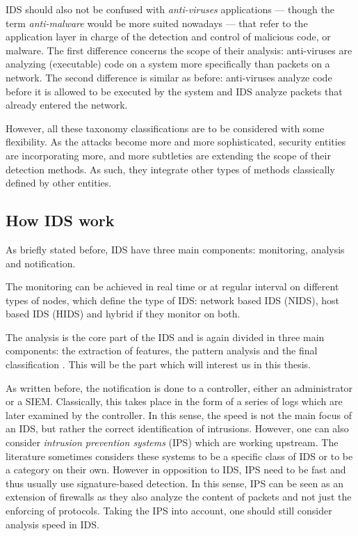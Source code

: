 IDS should also not be confused with \emph{anti-viruses} applications --- though the term \emph{anti-malware} would be more suited nowadays --- that refer to the application layer in charge of the detection and control of malicious code, or malware. The first difference concerns the scope of their analysis: anti-viruses are analyzing (executable) code on a system more specifically than packets on a network. The second difference is similar as before: anti-viruses analyze code before it is allowed to be executed by the system and IDS analyze packets that already entered the network.

However, all these taxonomy classifications are to be considered with some flexibility. As the attacks become more and more sophisticated, security entities are incorporating more, and more subtleties are extending the scope of their detection methods. As such, they integrate other types of methods classically defined by other entities.

\subsection{How IDS work}
As briefly stated before, IDS have three main components: monitoring, analysis and notification. 

The monitoring can be achieved in real time or at regular interval on different types of nodes, which define the type of IDS: network based IDS (NIDS), host based IDS (HIDS) and hybrid if they monitor on both. 

The analysis is the core part of the IDS and is again divided in three main components: the extraction of features, the pattern analysis and the final classification \cite{Winter2018}. This will be the part which will interest us in this thesis.

As written before, the notification is done to a controller, either an administrator or a SIEM. Classically, this takes place in the form of a series of logs which are later examined by the controller. In this sense, the speed is not the main focus of an IDS, but rather the correct identification of intrusions. However, one can also consider \emph{intrusion prevention systems} (IPS) which are working upstream. The literature sometimes considers these systems to be a specific class of IDS or to be a category on their own. However in opposition to IDS, IPS need to be fast and thus usually use signature-based detection. In this sense, IPS can be seen as an extension of firewalls as they also analyze the content of packets and not just the enforcing of protocols. Taking the IPS into account, one should still consider analysis speed in IDS.

